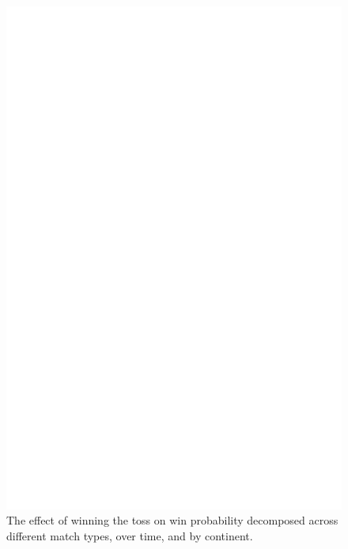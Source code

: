 \documentclass[12pt, letterpaper]{article}
\begin{document}
\begin{figure}[b]
  \centering
  \includegraphics[scale=.5]{output/reduced_form_by_matchtype.pdf}
  \caption{The effect of winning the toss on win probability decomposed across different match types, over time, and by continent.}
  \label{fig:rf_het_TE}
\end{figure}

\clearpage
\end{document}
